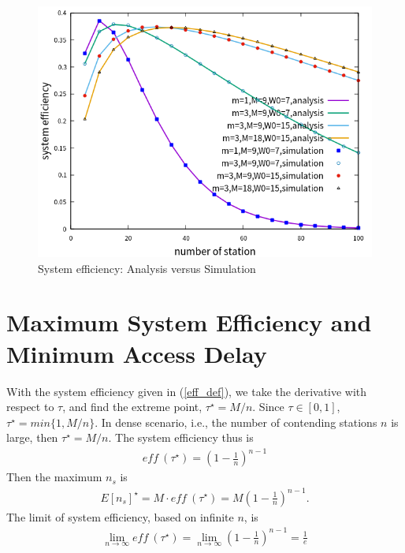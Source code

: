 \documentclass[journal]{IEEEtran}
\begin{document}
\begin{figure}[!h]
\includegraphics[scale=0.54]{./figure/multiple_parameter.png}
\caption{System efficiency: Analysis versus Simulation}
\label{validation}
\end{figure}

\section{Maximum System Efficiency and Minimum Access Delay} 	\label{sec_max_min}
With the system efficiency given in (\ref{eff_def}), we take the derivative with respect to $\tau$, and find the extreme point, $\tau^\star = M/n$. Since $\tau\in [0,1]$, $\tau^\star = min\lbrace 1,M/n\rbrace$. 
In dense scenario, i.e., the number of contending stations $n$ is large, then $\tau^\star = M/n$. 
The system efficiency thus is
\begin{align}
\textit{eff}\ (\tau^\star) = (1-\frac{1}{n})^{n-1} 
\label{equ_max_eff}
\end{align}
Then the maximum $n_s$ is 
\begin{align}
\label{equ_max_ns}
E[n_s]^\star = M \cdot \textit{eff}\ (\tau^\star) = M(1-\frac{1}{n})^{n-1} .
\end{align}
The limit of system efficiency, based on infinite $n$, is
\begin{align}
\label{eff_limit}
\lim_{n\rightarrow \infty}\textit{eff}\ (\tau^\star) = \lim_{n\rightarrow \infty}(1-\frac{1}{n})^{n-1} =\frac{1}{e} 
\end{align}
\end{document}
